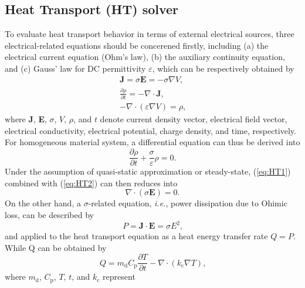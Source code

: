 \subsection{Heat Transport (HT) solver} \label{sec:2.4.2}
    To evaluate heat transport behavior in terms of external electrical sources, 
    three electrical-related equations should be concerened firstly, including 
    (a) the electrical current equation (Ohm's law), 
    (b) the auxiliary continuity equation, and 
    (c) Gauss' law for DC permittivity $\varepsilon$, which can be respectively obtained by 
    \begin{align}
        \textbf{J} = \sigma \textbf{E} = -\sigma \nabla V\text{,}\label{eq:HT1}\\
        \frac{\partial \rho}{\partial t} = -\nabla\cdot\textbf{J}\text{,}\label{eq:HT2}\\
        -\nabla\cdot(\varepsilon \nabla V) = \rho \text{,}\label{eq:HT3}
    \end{align}
    where \textbf{J}, \textbf{E}, $\sigma$, $V$, $\rho$, and $t$ denote 
    current density vector, electrical field vector, electrical conductivity, electrical potential, charge density, and time, respectively. 
    For homogeneous material system, 
    a differential equation can thus be derived into 
    \begin{equation}
        \frac{\partial \rho}{\partial t} + \frac{\sigma}{\varepsilon}\rho = 0\textit{.}\label{eq:HT4}
    \end{equation}
    Under the assumption of quasi-static approximation or steady-state, 
    (\ref{eq:HT1}) combined with (\ref{eq:HT2}) can then reduces into 
    \begin{equation}
        \nabla\cdot(\sigma\textbf{E}) = 0\text{.}\label{eq:HT5}
    \end{equation}
    On the other hand, 
    a $\sigma$-related equation, \textit{i.e.}, 
    power dissipation due to Ohimic loss, can be described by 
    \begin{equation}
        P = \textbf{J}\cdot\textbf{E} = \sigma E^2\text{,}\label{eq:HT6}
    \end{equation}
    and applied to the heat transport equation as a heat energy transfer rate $Q = P$. 
    While Q can be obtained by 
    \begin{equation}
        Q = m_\text{d} C_\text{p} \frac{\partial T}{\partial t} - \nabla \cdot (k_\text{c}\nabla T)\text{,}\label{eq:HT7}
    \end{equation}
    where $m_\text{d}$, $C_\text{p}$, $T$, $t$, and $k_\text{c}$ represent 
